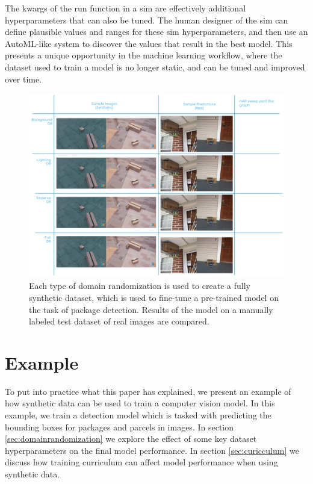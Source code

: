 \documentclass{article}
\begin{document}
The kwargs of the run function in a sim are effectively additional hyperparameters that can also be tuned. The human designer of the sim can define plausible values and ranges for these sim hyperparameters, and then use an AutoML-like system to discover the values that result in the best model. This presents a unique opportunity in the machine learning workflow, where the dataset used to train a model is no longer static, and can be tuned and improved over time.

\begin{figure}
	\centering
	\includegraphics[width=\textwidth]{results.png}
	\caption{Each type of domain randomization is used to create a fully synthetic dataset, which is used to fine-tune a pre-trained model on the task of package detection. Results of the model on a manually labeled test dataset of real images are compared.}
	\label{fig:results}
\end{figure}

\section{Example}
\label{sec:example}

To put into practice what this paper has explained, we present an example of how synthetic data can be used to train a computer vision model. In this example, we train a detection model which is tasked with predicting the bounding boxes for packages and parcels in images. In section \ref{sec:domainrandomization} we explore the effect of some key dataset hyperparameters on the final model performance. In section \ref{sec:curicculum} we discuss how training curriculum can affect model performance when using synthetic data.
\end{document}

